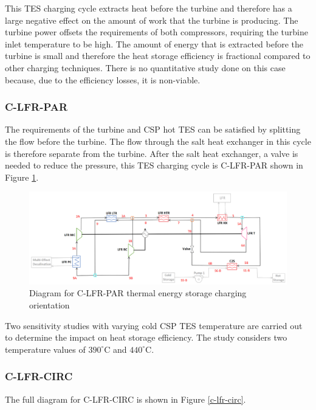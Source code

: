 \begin{paracol}{2}
\linenumbers
\switchcolumn

This TES charging cycle extracts heat before the turbine and therefore has a large negative effect on the amount of work that the turbine is producing. The turbine power offsets the requirements of both compressors, requiring the turbine inlet temperature to be high. The amount of energy that is extracted before the turbine is small and therefore the heat storage efficiency is fractional compared to other charging techniques. There is no quantitative study done on this case because, due to the efficiency losses, it is non-viable. 


\subsubsection{C-LFR-PAR} 

The requirements of the turbine and CSP hot TES can be satisfied by splitting the flow before the turbine. The flow through the salt heat exchanger in this cycle is therefore separate from the turbine. After the salt heat exchanger, a valve is needed to reduce the pressure, this TES charging cycle is C-LFR-PAR shown in Figure \ref{c-lfr-par}.

\end{paracol}
\begin{figure}[H]
    \widefigure
    \includegraphics[width=\linewidth]{Definitions/c-lfr-par.pdf}
    \caption{Diagram for C-LFR-PAR thermal energy storage charging orientation\label{c-lfr-par}}
\end{figure}
\begin{paracol}{2}
\linenumbers
\switchcolumn

Two sensitivity studies  with varying cold CSP TES temperature are carried out to determine the impact on heat storage efficiency. The study considers two temperature values of $390^{\circ}$C and $440^{\circ}$C.

\subsubsection{C-LFR-CIRC} 

The full diagram for C-LFR-CIRC is shown in Figure \ref{c-lfr-circ}.

\end{paracol}
